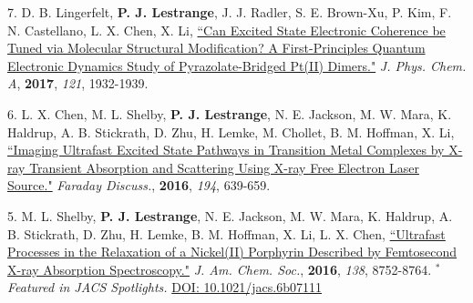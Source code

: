 


\begin{cvpublications}



\cvpublication
{7.} 
{D. B. Lingerfelt, \textbf{P. J. Lestrange}, J. J. Radler, S. E. Brown-Xu, P. Kim, F. N. Castellano, L. X. Chen, X. Li, \href{http://pubs.acs.org/doi/abs/10.1021/acs.jpca.6b12099}{``Can Excited State Electronic Coherence be Tuned via Molecular Structural Modification? A First-Principles Quantum Electronic Dynamics Study of Pyrazolate-Bridged Pt(II) Dimers."} \textit{J. Phys. Chem. A}, \textbf{2017}, \textit{121}, 1932-1939.} 


\cvpublication
{6.} 
{L. X. Chen, M. L. Shelby, \textbf{P. J. Lestrange}, N. E. Jackson, M. W. Mara, K. Haldrup, A. B. Stickrath, D. Zhu, H. Lemke, M. Chollet, B. M. Hoffman, X. Li,  \href{http://pubs.rsc.org/en/Content/ArticleLanding/2016/FD/C6FD00083E}{``Imaging Ultrafast Excited State Pathways in Transition Metal Complexes by X-ray Transient Absorption and Scattering Using X-ray Free Electron Laser Source."} \textit{Faraday Discuss.}, \textbf{2016}, \textit{194}, 639-659.} 


\cvpublication
{5.} 
{M. L. Shelby, \textbf{P. J. Lestrange}, N. E. Jackson, M. W. Mara, K. Haldrup, A. B. Stickrath, D. Zhu, H. Lemke, B. M. Hoffman, X. Li, L. X. Chen, \href{http://pubs.acs.org/doi/abs/10.1021/jacs.6b02176}{``Ultrafast Processes in the Relaxation of a Nickel(II) Porphyrin Described by Femtosecond X-ray Absorption Spectroscopy."} \textit{J. Am. Chem. Soc.}, \textbf{2016}, \textit{138}, 8752-8764. $^*$\textit{Featured in JACS Spotlights.} \href{http://pubs.acs.org/doi/abs/10.1021/jacs.6b07111}{DOI: 10.1021/jacs.6b07111}} 


\end{cvpublications}
